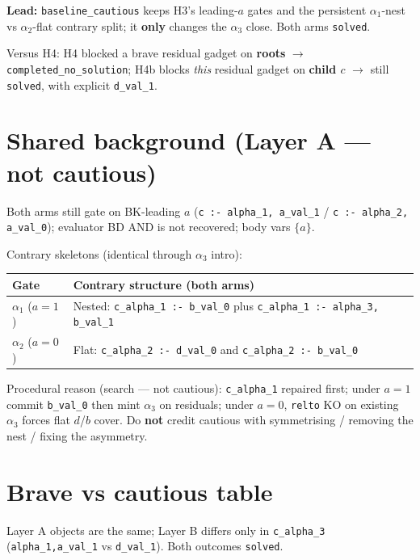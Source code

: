 \documentclass[11pt]{article}
\begin{document}
\textbf{Lead:} \texttt{baseline\_cautious} keeps H3's leading-\(a\) gates and
the persistent \(\alpha_1\)-nest vs \(\alpha_2\)-flat contrary split; it
\textbf{only} changes the \(\alpha_3\) close.
Both arms \texttt{solved}.

Versus H4: H4 blocked a brave residual gadget on \textbf{roots}
\(\to\) \texttt{completed\_no\_solution}; H4b blocks \emph{this} residual gadget
on \textbf{child \(c\)} \(\to\) still \texttt{solved}, with explicit
\texttt{d\_val\_1}.

\section{Shared background (Layer A --- not cautious)}

Both arms still gate on BK-leading \(a\)
(\texttt{c :- alpha\_1, a\_val\_1} / \texttt{c :- alpha\_2, a\_val\_0});
evaluator BD AND is not recovered; body vars \(\{a\}\).

Contrary skeletons (identical through \(\alpha_3\) intro):
\begin{center}
\begin{tabular}{@{}lL{0.62\textwidth}@{}}
\toprule
Gate & Contrary structure (both arms) \\
\midrule
\(\alpha_1\) (\(a{=}1\)) &
  Nested: \texttt{c\_alpha\_1 :- b\_val\_0} plus
  \texttt{c\_alpha\_1 :- alpha\_3, b\_val\_1} \\
\(\alpha_2\) (\(a{=}0\)) &
  Flat: \texttt{c\_alpha\_2 :- d\_val\_0} and
  \texttt{c\_alpha\_2 :- b\_val\_0} \\
\bottomrule
\end{tabular}
\end{center}

Procedural reason (search --- not cautious):
\texttt{c\_alpha\_1} repaired first; under \(a{=}1\) commit \texttt{b\_val\_0}
then mint \(\alpha_3\) on residuals; under \(a{=}0\), \texttt{relto} KO on
existing \(\alpha_3\) forces flat \(d\)/\(b\) cover.
Do \textbf{not} credit cautious with symmetrising / removing the nest / fixing
the asymmetry.

\section{Brave vs cautious table}

Layer A objects are the same; Layer B differs only in \texttt{c\_alpha\_3}
(\texttt{alpha\_1,a\_val\_1} vs \texttt{d\_val\_1}).
Both outcomes \texttt{solved}.
\end{document}
